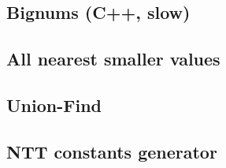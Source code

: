 \documentclass[9pt]{extarticle}
\begin{document}
\begin{multicols*}{3}
\subsection{Bignums (C++, slow)} %


\subsection{All nearest smaller values} %


\subsection{Union-Find}


\subsection{NTT constants generator}



\end{multicols*}
\end{document}
